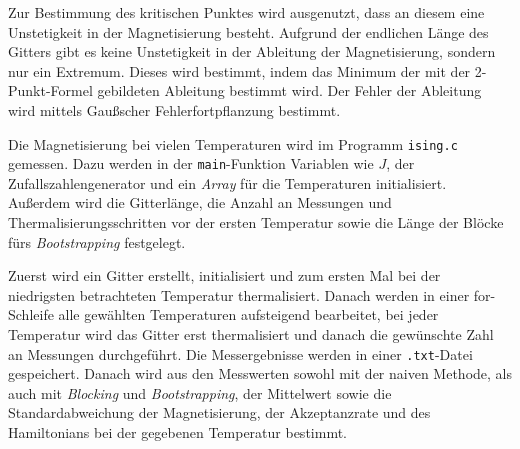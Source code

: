 	
	
	
	Zur Bestimmung des kritischen Punktes wird ausgenutzt, dass an diesem eine Unstetigkeit in der Magnetisierung besteht. Aufgrund der endlichen Länge des Gitters gibt es keine Unstetigkeit in der Ableitung der Magnetisierung, sondern nur ein Extremum. Dieses wird bestimmt, indem das Minimum der mit der 2-Punkt-Formel gebildeten Ableitung bestimmt wird. Der Fehler der Ableitung wird mittels Gaußscher Fehlerfortpflanzung bestimmt.
		
	Die Magnetisierung bei vielen Temperaturen wird im Programm \texttt{ising.c} gemessen. Dazu werden in der \texttt{main}-Funktion Variablen wie $J$, der Zufallszahlengenerator und ein \textit{Array} für die Temperaturen initialisiert. Außerdem wird die Gitterlänge, die Anzahl an Messungen und Thermalisierungsschritten vor der ersten Temperatur sowie die Länge der Blöcke fürs \textit{Bootstrapping} festgelegt. 	
	
	Zuerst wird ein Gitter erstellt, initialisiert und zum ersten Mal bei der niedrigsten betrachteten Temperatur thermalisiert. Danach werden in einer for-Schleife alle gewählten Temperaturen aufsteigend bearbeitet, bei jeder Temperatur wird das Gitter erst thermalisiert und danach die gewünschte Zahl an Messungen durchgeführt.
	Die Messergebnisse werden in einer \texttt{.txt}-Datei gespeichert. Danach wird aus den Messwerten sowohl mit der naiven Methode, als auch mit \textit{Blocking} und \textit{Bootstrapping}, der Mittelwert sowie die Standardabweichung der Magnetisierung, der Akzeptanzrate und des Hamiltonians bei der gegebenen Temperatur bestimmt.
	
